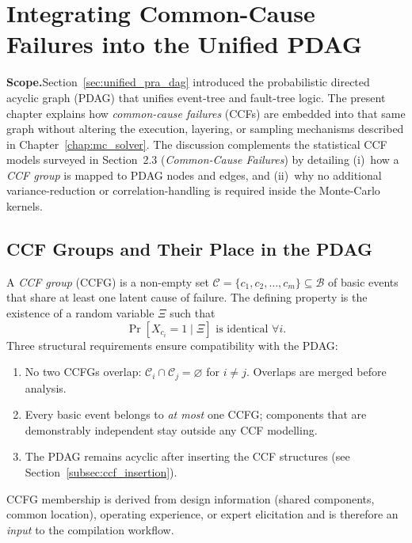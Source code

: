 \chapter{Integrating Common-Cause Failures into the Unified PDAG}
\label{chap:ccf_in_pdag}

\noindent\textbf{Scope.}\;Section~\ref{sec:unified_pra_dag} introduced the
probabilistic directed acyclic graph (PDAG) that unifies event-tree and
fault-tree logic.  The present chapter explains how \emph{common-cause
failures} (CCFs) are embedded into that same graph without altering the
execution, layering, or sampling mechanisms described in
Chapter~\ref{chap:mc_solver}.  The discussion complements the statistical CCF
models surveyed in Section~2.3 (\emph{Common-Cause Failures}) by detailing
(i)~how a \textit{CCF group} is mapped to PDAG nodes and edges, and
(ii)~why no additional variance-reduction or correlation-handling is required
inside the Monte-Carlo kernels.

\section{CCF Groups and Their Place in the PDAG}
\label{sec:ccf_group_def}

A \emph{CCF group} (CCFG) is a non-empty set
\(\mathcal{C}=\{c_1,c_2,\dots ,c_m\}\subseteq \mathcal{B}\) of basic events
that share at least one latent cause of failure.  The defining property is the
existence of a random variable
\(\Xi\) such that
\[\Pr[ X_{c_i}=1 \mid \Xi ] \text{ is identical } \forall i.\]
Three structural requirements ensure compatibility with the PDAG:
\begin{enumerate}
  \item No two CCFGs overlap: \(\mathcal{C}_i\cap\mathcal{C}_j=\varnothing\) for
        \(i\ne j\).  Overlaps are merged before analysis.
  \item Every basic event belongs to \emph{at most} one CCFG; components that
        are demonstrably independent stay outside any CCF modelling.
  \item The PDAG remains acyclic after inserting the CCF structures (see
        Section~\ref{subsec:ccf_insertion}).
\end{enumerate}
CCFG membership is derived from design information (shared components, common
location), operating experience, or expert elicitation and is therefore an
\emph{input} to the compilation workflow.

